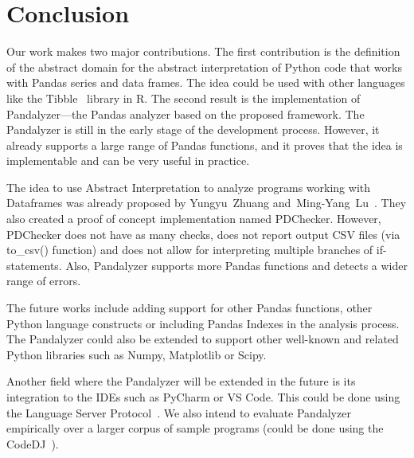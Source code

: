 \section{Conclusion}

Our work makes two major contributions.
The first contribution is the definition of the abstract domain for the abstract interpretation of Python code
that works with Pandas series and data frames.
The idea could be used with other languages like the Tibble~\cite{tibble} library in R\@.
The second result is the implementation of Pandalyzer---the Pandas analyzer based on the proposed framework.
The Pandalyzer is still in the early stage of the development process.
However, it already supports a large range of Pandas functions, and it proves that the idea is implementable and can be
very useful in practice.

The idea to use Abstract Interpretation to analyze programs working with Dataframes was already proposed
by Yungyu~Zhuang and~Ming-Yang~Lu~\cite{Zhuang:2022:TypeChecking}.
They also created a proof of concept implementation named PDChecker.
However, PDChecker does not have as many checks, does not report output CSV files (via to\_csv() function) and
does not allow for interpreting multiple branches of if-statements.
Also, Pandalyzer supports more Pandas functions and detects a wider range of errors.

The future works include adding support for other Pandas functions, other Python language constructs or including
Pandas Indexes in the analysis process.
The Pandalyzer could also be extended to support other well-known and related Python libraries such as Numpy,
Matplotlib or Scipy.

Another field where the Pandalyzer will be extended in the future is its integration to the IDEs such as PyCharm or
VS Code.
This could be done using the Language Server Protocol~\cite{language_server_protocol}.
We also intend to evaluate Pandalyzer empirically over a larger corpus of sample programs
(could be done using the CodeDJ~\cite{vakar2021causality}).